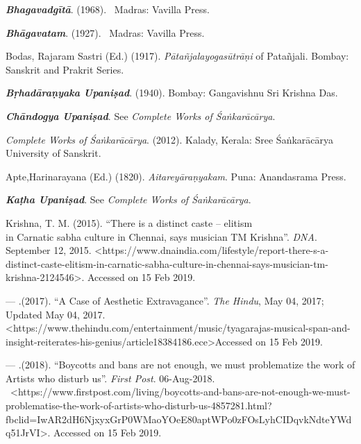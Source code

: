 \begin{thebibliography}{99}
\itemsep=1pt

  \textbf{\textit{Bhagavadgītā}}. (1968).  Madras: Vavilla Press.

  \textbf{\textit{Bhāgavatam}}. (1927).  Madras: Vavilla Press.

  Bodas, Rajaram Sastri (Ed.) (1917). \textit{Pātañjalayogasūtrāṇi} of Patañjali. Bombay: Sanskrit and Prakrit Series.

  \textbf{\textit{Bṛhadāraṇyaka Upaniṣad}}. (1940). Bombay: Gangavishnu Sri Krishna Das.

  \textbf{\textit{Chāndogya Upaniṣad}}. See \textit{Complete Works of Śaṅkarācārya}.

  \textit{Complete Works of Śaṅkarācārya}. (2012). Kalady, Kerala: Sree Śaṅkarācārya University of Sanskrit.

  Apte,Harinarayana (Ed.) (1820). \textit{Aitareyāraṇyakam}. Puna: Anandasrama Press.

  \textbf{\textit{Kaṭha Upaniṣad}}. See \textit{Complete Works of Śaṅkarācārya}.

  Krishna, T. M. (2015). “There is a distinct caste – elitism\\ in Carnatic sabha culture in Chennai, says musician TM Krishna”. \textit{DNA}. September 12, 2015. \textless  https://www.dnaindia.com/lifestyle/report-there-s-a-distinct-caste-elitism-in-carnatic-sabha-culture-in-chennai-says-musician-tm-krishna-2124546\textgreater . Accessed on 15 Feb 2019.

  — .(2017). “A Case of Aesthetic Extravagance”. \textit{The Hindu}, May 04, 2017; Updated May 04, 2017. \textless https://www.thehindu.com/entertainment/\break music/tyagarajas-musical-span-and-insight-reiterates-his-genius/article18384186.ece\textgreater  Accessed on 15 Feb 2019.

  — .(2018). “Boycotts and bans are not enough, we must problematize the work of Artists who disturb us”. \textit{First Post}. 06-Aug-2018.  \textless https://www.firstpost.com/living/boycotts-and-bans-are-not-enough-we-must-problematise-the-work-of-artists-who-disturb-us-4857281.html?fbclid=IwAR2dH6NjxyxGrP0WMaoYOeE80apt\break WPo0zFOsLyhCIDqvkNdteYWdq51JrVI\textgreater . Accessed on 15 Feb 2019.


\end{thebibliography}
